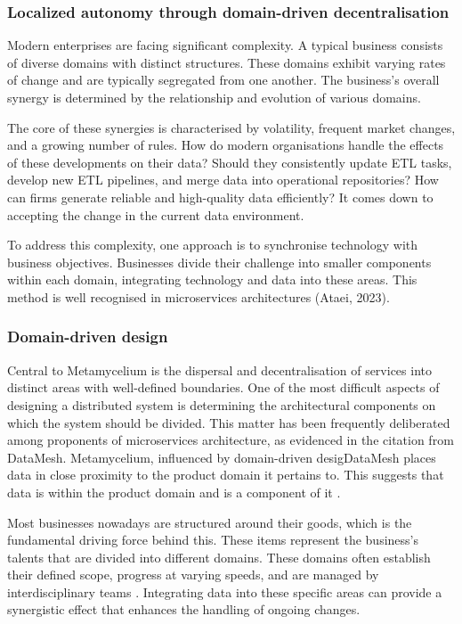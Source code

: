 \documentclass[preprint,12pt]{elsarticle}
\begin{document}
\subsubsection{Localized autonomy through domain-driven decentralisation}

Modern enterprises are facing significant complexity. A typical business consists of diverse domains with distinct structures. These domains exhibit varying rates of change and are typically segregated from one another. The business's overall synergy is determined by the relationship and evolution of various domains. 

The core of these synergies is characterised by volatility, frequent market changes, and a growing number of rules. How do modern organisations handle the effects of these developments on their data? Should they consistently update ETL tasks, develop new ETL pipelines, and merge data into operational repositories? How can firms generate reliable and high-quality data efficiently? It comes down to accepting the change in the current data environment. 

To address this complexity, one approach is to synchronise technology with business objectives. Businesses divide their challenge into smaller components within each domain, integrating technology and data into these areas. This method is well recognised in microservices architectures (Ataei, 2023). 

\subsubsection{Domain-driven design}


Central to Metamycelium is the dispersal and decentralisation of services into distinct areas with well-defined boundaries. One of the most difficult aspects of designing a distributed system is determining the architectural components on which the system should be divided. This matter has been frequently deliberated among proponents of microservices architecture, as evidenced in the citation from DataMesh. Metamycelium, influenced by domain-driven desigDataMesh places data in close proximity to the product domain it pertains to. This suggests that data is within the product domain and is a component of it \cite{laigner2021data}.

Most businesses nowadays are structured around their goods, which is the fundamental driving force behind this. These items represent the business's talents that are divided into different domains. These domains often establish their defined scope, progress at varying speeds, and are managed by interdisciplinary teams \cite{teamtopologiesSkelton}. Integrating data into these specific areas can provide a synergistic effect that enhances the handling of ongoing changes.
\end{document}
